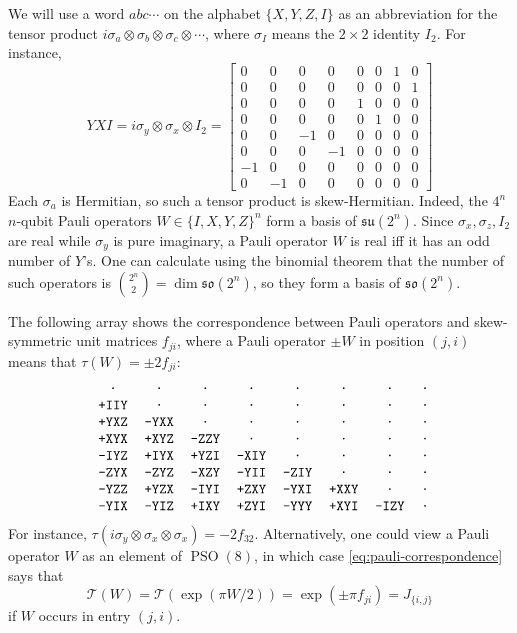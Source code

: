 \documentclass[reqno]{amsart}
\theoremstyle{definition} \newtheorem{example}[theorem]{Example}
\newcommand{\PSO}{\operatorname{PSO}}
\newcommand{\so}{\mathfrak{so}}
\newcommand{\su}{\mathfrak{su}}
\newcommand{\T}{\mathcal{T}}
\begin{document}
We will use a word $abc\cdots$ on the alphabet $\{X,Y,Z,I\}$ as an abbreviation for the tensor product $i\sigma_a \otimes \sigma_b \otimes \sigma_c \otimes \cdots$, where $\sigma_I$ means the $2 \times 2$ identity $I_2$. For instance,
\begin{equation*}
YXI = i\sigma_y \otimes \sigma_x \otimes I_2 = \left[ 
\begin{smallmatrix}
0 & 0 & 0 & 0 & 0 & 0 & 1 & 0\\
0 & 0 & 0 & 0 & 0 & 0 & 0 & 1\\
0 & 0 & 0 & 0 & 1 & 0 & 0 & 0\\
0 & 0 & 0 & 0 & 0 & 1 & 0 & 0\\
0 & 0 & -1 & 0 & 0 & 0 & 0 & 0\\
0 & 0 & 0 & -1 & 0 & 0 & 0 & 0\\
-1 & 0 & 0 & 0 & 0 & 0 & 0 & 0\\
0 & -1 & 0 & 0 & 0 & 0 & 0 & 0
\end{smallmatrix} \right] \end{equation*}
Each $\sigma_a$ is Hermitian, so such a tensor product is skew-Hermitian. Indeed, the $4^n$ $n$-qubit Pauli operators $W \in \{I,X,Y,Z\}^n$ form a basis of $\su(2^n)$. Since $\sigma_x, \sigma_z, I_2$ are real while $\sigma_y$ is pure imaginary, a Pauli operator $W$ is real iff it has an odd number of $Y$'s. One can calculate using the binomial theorem that the number of such operators is ${2^n \choose 2} = \dim \so(2^n)$, so they form a basis of $\so(2^n)$.

The following array shows the correspondence between Pauli operators and skew-symmetric unit matrices $f_{ji}$, where a Pauli operator $\pm W$ in position $(j,i)$ means that $\tau(W) = \pm 2f_{ji}$:
\begin{equation} \label{eq:pauli-correspondence}
\text{\texttt{
\begin{tabular}{cccccccc}
· & · & · & · & · & · & · & · \\                          
+IIY & · & · & · & · & · & · & ·\\ 
+YXZ & -YXX & · & · & · & · & · & ·\\
+XYX & +XYZ & -ZZY & · & · & · & · & ·\\
-IYZ & +IYX & +YZI & -XIY & · & · & · & ·\\
-ZYX & -ZYZ & -XZY & -YII & -ZIY & · & · & ·\\
-YZZ & +YZX & -IYI & +ZXY & -YXI & +XXY & · & ·\\
-YIX & -YIZ & +IXY & +ZYI & -YYY & +XYI & -IZY & ·
\end{tabular}}}
\end{equation}
For instance, $\tau(i\sigma_y \otimes \sigma_x \otimes \sigma_x) = -2f_{32}$. Alternatively, one could view a Pauli operator $W$ as an element of $\PSO(8)$, in which case \eqref{eq:pauli-correspondence} says that
\begin{equation*}
\T(W) = \T(\exp(\pi W/2)) = \exp(\pm \pi f_{ji}) = J_{\{i,j\}}
\end{equation*}
if $W$ occurs in entry $(j,i)$.
\end{document}
